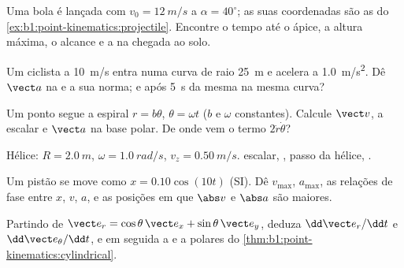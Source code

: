 \begin{exercise}[$\star$]\label{exo:b1:point-kinematics:4}
Uma bola é lançada com $v_0 = \qty{12}{m/s}$ a $\alpha = 40^\circ$; as suas
coordenadas são as do \cref{ex:b1:point-kinematics:projectile}.
Encontre o tempo até o ápice, a altura máxima, o alcance e a
 na chegada ao solo.
\end{exercise}

\begin{exercise}[$\star\star$]\label{exo:b1:point-kinematics:5}
Um ciclista a \qty{10}{m/s} entra numa curva de raio \qty{25}{m} e
acelera a \qty{1.0}{m/s^2}. Dê $\vect a$ na  e
a sua norma; e após \qty{5}{s} da mesma  na mesma curva?
\end{exercise}

\begin{exercise}[$\star\star$]\label{exo:b1:point-kinematics:6}
Um ponto segue a espiral $r = b\theta$, $\theta = \omega t$ ($b$ e
$\omega$ constantes). Calcule $\vect v$, a  escalar e $\vect a$ na
base polar. De onde vem o termo $2\dot r\dot\theta$?
\end{exercise}

\begin{exercise}[$\star\star$]\label{exo:b1:point-kinematics:7}
Hélice: $R = \qty{2.0}{m}$, $\omega = \qty{1.0}{rad/s}$, $v_z = \qty{0.50}{m/s}$.
 escalar, , passo da hélice, .
\end{exercise}

\begin{exercise}[$\star\star$]\label{exo:b1:point-kinematics:8}
Um pistão se move como $x = 0.10\cos(10t)$ (SI). Dê $v_{\max}$, $a_{\max}$,
as relações de fase entre $x$, $v$, $a$, e as posições em que
$\abs v$ e $\abs a$ são maiores.
\end{exercise}

\begin{exercise}[$\star\star$]\label{exo:b1:point-kinematics:9}
Partindo de $\vect e_r = \cos\theta\,\vect e_x + \sin\theta\,\vect e_y$,
deduza $\dd\vect e_r/\dd t$ e $\dd\vect e_\theta/\dd t$, e em seguida a
 e a  polares do \cref{thm:b1:point-kinematics:cylindrical}.
\end{exercise}

